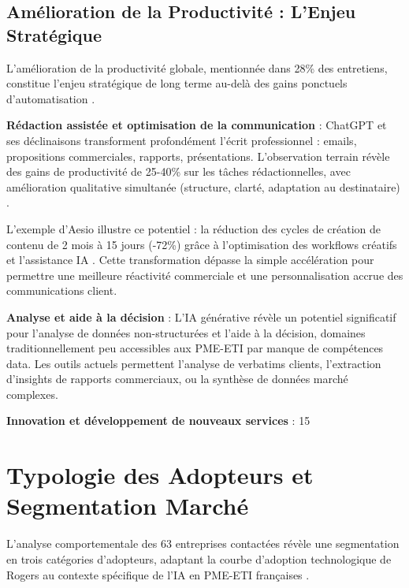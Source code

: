 \subsection{Amélioration de la Productivité : L'Enjeu Stratégique}

L'amélioration de la productivité globale, mentionnée dans 28\% des entretiens, constitue l'enjeu stratégique de long terme au-delà des gains ponctuels d'automatisation \cite{brynjolfsson2017business}.

\textbf{Rédaction assistée et optimisation de la communication} : ChatGPT et ses déclinaisons transforment profondément l'écrit professionnel : emails, propositions commerciales, rapports, présentations. L'observation terrain révèle des gains de productivité de 25-40\% sur les tâches rédactionnelles, avec amélioration qualitative simultanée (structure, clarté, adaptation au destinataire) \cite{luwai2025meetings}.

L'exemple d'Aesio illustre ce potentiel : la réduction des cycles de création de contenu de 2 mois à 15 jours (-72\%) grâce à l'optimisation des workflows créatifs et l'assistance IA \cite{luwai2025aesio}. Cette transformation dépasse la simple accélération pour permettre une meilleure réactivité commerciale et une personnalisation accrue des communications client.

\textbf{Analyse et aide à la décision} : L'IA générative révèle un potentiel significatif pour l'analyse de données non-structurées et l'aide à la décision, domaines traditionnellement peu accessibles aux PME-ETI par manque de compétences data. Les outils actuels permettent l'analyse de verbatims clients, l'extraction d'insights de rapports commerciaux, ou la synthèse de données marché complexes.

\textbf{Innovation et développement de nouveaux services} : 15%

\section{Typologie des Adopteurs et Segmentation Marché}

L'analyse comportementale des 63 entreprises contactées révèle une segmentation en trois catégories d'adopteurs, adaptant la courbe d'adoption technologique de Rogers au contexte spécifique de l'IA en PME-ETI françaises \cite{rogers2003diffusion}.

